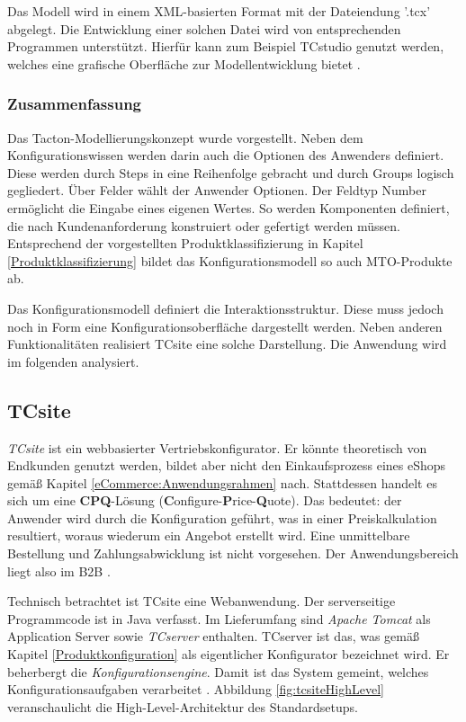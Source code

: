 \documentclass[11pt, a4paper, titlepage, listof=totoc, bibliography=totoc, index=totoc, twoside, openright, headings=normal]{scrreprt}
\begin{document}
Das Modell wird in einem XML-basierten Format mit der Dateiendung '.tcx' abgelegt. Die Entwicklung einer solchen Datei wird von entsprechenden Programmen unterstützt. Hierfür kann zum Beispiel \glqq TCstudio\grqq{} genutzt werden, welches eine grafische Oberfläche zur Modellentwicklung bietet \citep{tactonAbout}.

\subsubsection*{Zusammenfassung}
Das Tacton-Modellierungskonzept wurde vorgestellt. Neben dem Konfigurationswissen werden darin auch die Optionen des Anwenders definiert. Diese werden durch Steps in eine Reihenfolge gebracht und durch Groups logisch gegliedert. Über Felder wählt der Anwender Optionen. Der Feldtyp Number ermöglicht die Eingabe eines eigenen Wertes. So werden Komponenten definiert, die nach Kundenanforderung konstruiert oder gefertigt werden müssen. Entsprechend der vorgestellten Produktklassifizierung in Kapitel \ref{Produktklassifizierung} bildet das Konfigurationsmodell so auch \ac{MTO}-Produkte ab.

Das Konfigurationsmodell definiert die Interaktionsstruktur. Diese muss jedoch noch in Form eine Konfigurationsoberfläche dargestellt werden. Neben anderen Funktionalitäten realisiert TCsite eine solche Darstellung. Die Anwendung wird im folgenden analysiert.

\subsection{TCsite}
\label{TCsite}
\emph{TCsite} ist ein webbasierter Vertriebskonfigurator. Er könnte theoretisch von Endkunden genutzt werden, bildet aber nicht den Einkaufsprozess eines eShops gemäß Kapitel \ref{eCommerce:Anwendungsrahmen} nach. Stattdessen handelt es sich um eine \textbf{CPQ}-Lösung (\textbf{C}onfigure-\textbf{P}rice-\textbf{Q}uote). Das bedeutet: der Anwender wird durch die Konfiguration geführt, was in einer Preiskalkulation resultiert, woraus wiederum ein Angebot erstellt wird. Eine unmittelbare Bestellung und Zahlungsabwicklung ist nicht vorgesehen. Der Anwendungsbereich liegt also im B2B \citep{tactonAbout}.

Technisch betrachtet ist TCsite eine Webanwendung. Der serverseitige Programmcode ist in Java verfasst. Im Lieferumfang sind \emph{Apache Tomcat} als Application Server sowie \emph{TCserver} enthalten. TCserver ist das, was gemäß Kapitel \ref{Produktkonfiguration} als eigentlicher Konfigurator bezeichnet wird. Er beherbergt die \emph{Konfigurationsengine}. Damit ist das System gemeint, welches Konfigurationsaufgaben verarbeitet \citep{tactonTCsiteHandbook}. Abbildung \ref{fig:tcsiteHighLevel} veranschaulicht die High-Level-Architektur des Standardsetups.
\end{document}
